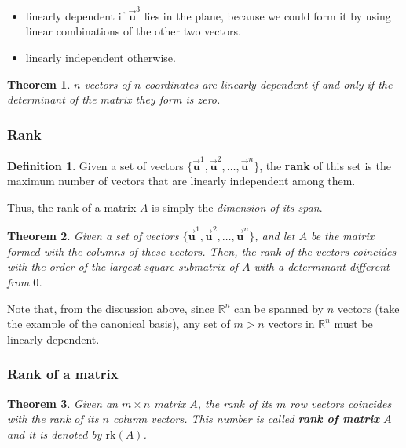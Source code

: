 \documentclass[a4paper,11pt]{article}
\theoremstyle{definition}
\newtheorem{definition}{Definition}
\theoremstyle{plain}
\newtheorem{theorem}{Theorem}
\begin{document}
\begin{itemize}
    \item linearly dependent if \(\vec{\mathbf{u}}^3\) lies in the plane, because we could form it by using linear combinations of the other two vectors. 

    \item linearly independent otherwise.
\end{itemize}

\begin{theorem}
\(n\) vectors of \(n\) coordinates are linearly
dependent if and only if the determinant of the matrix they form is
zero.
\end{theorem}

\subsubsection{Rank}\label{rank}

\begin{definition}
Given a set of vectors \(\{\vec{\mathbf{u}}^1,\vec{\mathbf{u}}^2,\ldots,\vec{\mathbf{u}}^n\}\), the \textbf{rank} of this set is the maximum number of vectors that are
linearly independent among them.
\end{definition}

Thus, the rank of a matrix \(A\) is simply the \emph{dimension of its span}.

\begin{theorem}
Given a set of vectors \(\{\vec{\mathbf{u}}^1,\vec{\mathbf{u}}^2,\ldots,\vec{\mathbf{u}}^n\}\), and let \(A\) be the matrix formed with the columns of these vectors. Then, the rank of the vectors coincides with the order of the largest square submatrix of \(A\) with a determinant different from \(0\). 
\end{theorem}

Note that, from the discussion above, since \(\mathbb{R}^n\) can be
spanned by \(n\) vectors (take the example of the canonical basis), any
set of \(m > n\) vectors in \(\mathbb{R}^n\) must be linearly dependent.

\subsubsection{Rank of a matrix}\label{rank-of-a-matrix}

\begin{theorem}
Given an \(m\times n\) matrix \(A\), the rank of its \(m\) row vectors coincides with the rank of its \(n\) column vectors. This number is called \textbf{rank of matrix} \(A\) and it is denoted by \(\text{rk}(A)\).
\end{theorem}
\end{document}
